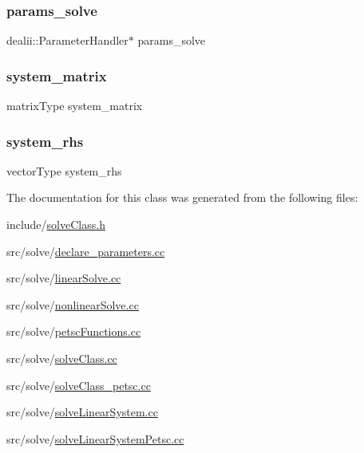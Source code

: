 \subsubsection{\texorpdfstring{params\_solve}{params\_solve}}
{\footnotesize\ttfamily dealii\+::\+Parameter\+Handler$\ast$ params\+\_\+solve}

\mbox{\label{classsolve_class_a56f7357eb335f9ce4ac30bc30d7513e8}} 
\subsubsection{\texorpdfstring{system\_matrix}{system\_matrix}}
{\footnotesize\ttfamily matrix\+Type system\+\_\+matrix}

\mbox{\label{classsolve_class_a6c39fa839fdc40d2408946617a778571}} 
\subsubsection{\texorpdfstring{system\_rhs}{system\_rhs}}
{\footnotesize\ttfamily vector\+Type system\+\_\+rhs}



The documentation for this class was generated from the following files\+:\begin{DoxyCompactItemize}
\item 
include/\mbox{\hyperlink{solve_class_8h}{solve\+Class.\+h}}\item 
src/solve/\mbox{\hyperlink{solve_2declare__parameters_8cc}{declare\+\_\+parameters.\+cc}}\item 
src/solve/\mbox{\hyperlink{linear_solve_8cc}{linear\+Solve.\+cc}}\item 
src/solve/\mbox{\hyperlink{nonlinear_solve_8cc}{nonlinear\+Solve.\+cc}}\item 
src/solve/\mbox{\hyperlink{petsc_functions_8cc}{petsc\+Functions.\+cc}}\item 
src/solve/\mbox{\hyperlink{solve_class_8cc}{solve\+Class.\+cc}}\item 
src/solve/\mbox{\hyperlink{solve_class__petsc_8cc}{solve\+Class\+\_\+petsc.\+cc}}\item 
src/solve/\mbox{\hyperlink{solve_linear_system_8cc}{solve\+Linear\+System.\+cc}}\item 
src/solve/\mbox{\hyperlink{solve_linear_system_petsc_8cc}{solve\+Linear\+System\+Petsc.\+cc}}\end{DoxyCompactItemize}
